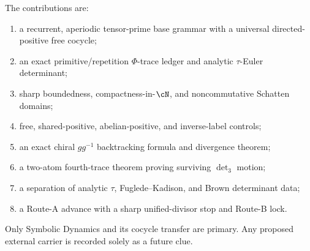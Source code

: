 The contributions are:
\begin{enumerate}
 \item a recurrent, aperiodic tensor-prime base grammar with a universal
       directed-positive free cocycle;
 \item an exact primitive/repetition $\Phi$-trace ledger and analytic
       $\tau$-Euler determinant;
 \item sharp boundedness, compactness-in-$\cN$, and noncommutative Schatten
       domains;
 \item free, shared-positive, abelian-positive, and inverse-label controls;
 \item an exact chiral $gg^{-1}$ backtracking formula and divergence theorem;
 \item a two-atom fourth-trace theorem proving surviving $\det_3$ motion;
 \item a separation of analytic $\tau$, Fuglede--Kadison, and Brown
       determinant data;
 \item a Route-A advance with a sharp unified-divisor stop and Route-B lock.
\end{enumerate}

Only Symbolic Dynamics and its cocycle transfer are primary.  Any proposed
external carrier is recorded solely as a future clue.

